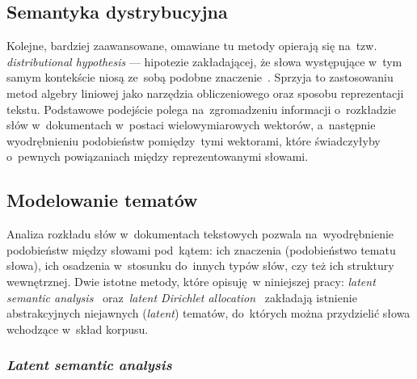 \documentclass[pl]{minipw} %
\begin{document}
\subsection{Semantyka dystrybucyjna}

Kolejne, bardziej zaawansowane, omawiane tu metody opierają się na~tzw. \textit{distributional hypothesis} --- hipotezie zakładającej, że słowa występujące w~tym samym kontekście niosą ze~sobą podobne znaczenie~\cite{bow}\cite{firth}. Sprzyja to zastosowaniu metod algebry liniowej jako narzędzia obliczeniowego oraz sposobu reprezentacji tekstu. Podstawowe podejście polega na~zgromadzeniu informacji o~rozkładzie słów w~dokumentach w~postaci wielowymiarowych wektorów, a~następnie wyodrębnieniu podobieństw pomiędzy~tymi wektorami, które świadczyłyby o~pewnych powiązaniach między reprezentowanymi słowami.

\subsection{Modelowanie tematów}

Analiza rozkładu słów w~dokumentach tekstowych pozwala na~wyodrębnienie podobieństw między słowami pod~kątem: ich znaczenia (podobieństwo tematu słowa), ich osadzenia w~stosunku do~innych typów słów, czy też ich struktury wewnętrznej. Dwie istotne metody, które opisuję~w niniejszej pracy: \textit{latent semantic analysis}~\cite{lsa} oraz~\textit{latent Dirichlet allocation}~\cite{lda} zakładają istnienie abstrakcyjnych niejawnych (\textit{latent}) tematów, do~których można przydzielić słowa wchodzące w~skład korpusu.

\subsubsection{\textit{Latent semantic analysis}}
\end{document}
